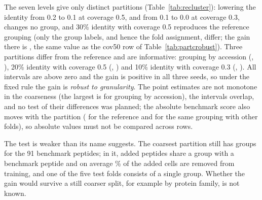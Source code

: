\begin{table}[htbp]
  \centering
  \caption{Gain of the relaxed threshold 4.0 (ridge M3) under different protein partitions. ``Groups'' are the groups of the
  91 benchmark peptides and of all 176 peptides; ``Shared'' is the number of added peptides that fall in a group of a
  benchmark peptide; ``Excl.'' is the mean percentage of the added cells that are removed from training because their
  group contains a test peptide.}\label{tab:recluster}
  
\end{table}

The seven levels give only \nRcNDistinct{} distinct partitions (Table~\ref{tab:recluster}): lowering the identity from 0.2 to 0.1
at coverage 0.5, and from 0.1 to 0.0 at coverage 0.3, changes no group, and 30\% identity with coverage 0.5 reproduces the
reference grouping (only the group labels, and hence the fold assignment, differ; the gain there is
\nRcFiftyD{} \nRcFiftyCI{}, the same value as the cov50 row of Table~\ref{tab:partcrobust}). Three partitions differ from the
reference and are informative: grouping by accession (\nRcAccD{}, \nRcAccCI{}), 20\% identity with coverage 0.5 (\nRcMidD{}, \nRcMidCI{}) and
10\% identity with coverage 0.3 (\nRcCoarseD{}, \nRcCoarseCI{}). All intervals are above zero and the gain is positive in all
three seeds, so under the fixed rule the gain is \emph{robust to granularity}. The point estimates are not monotone in the
coarseness (the largest is for grouping by accession), the intervals overlap, and no test of their differences was
planned; the absolute benchmark score also moves with the partition (\nAucRidge{} for the reference and \nRcFiftyBase{} for the same grouping with
other folds), so absolute values must not be compared across rows.

The test is weaker than its name suggests. The coarsest partition still has \nRcCoarseGroups{} groups for the 91 benchmark peptides; in
it, \nRcCoarseShared{} added peptides share a group with a benchmark peptide and on average \nRcCoarseExcl\% of the added cells are removed
from training, and one of the five test folds consists of a single group. Whether the gain would survive a still coarser
split, for example by protein family, is not known.

